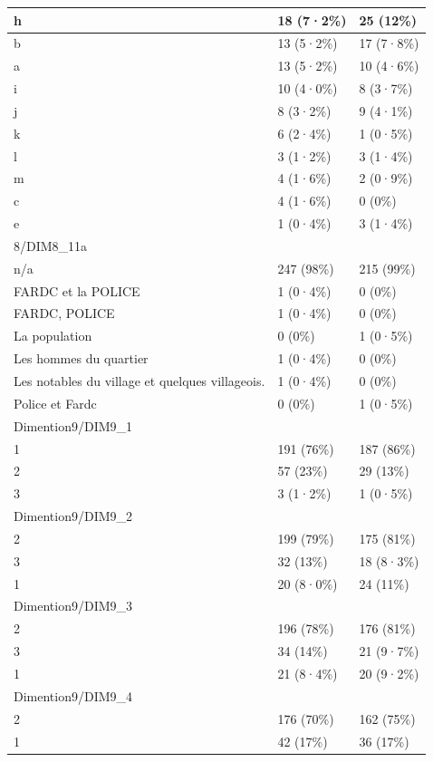 \documentclass[
]{book}
\begin{document}
\begin{tabular}{l|l|l}
\hline
h & 18 (7·2\%) & 25 (12\%)\\
\hline
b & 13 (5·2\%) & 17 (7·8\%)\\
\hline
a & 13 (5·2\%) & 10 (4·6\%)\\
\hline
i & 10 (4·0\%) & 8 (3·7\%)\\
\hline
j & 8 (3·2\%) & 9 (4·1\%)\\
\hline
k & 6 (2·4\%) & 1 (0·5\%)\\
\hline
l & 3 (1·2\%) & 3 (1·4\%)\\
\hline
m & 4 (1·6\%) & 2 (0·9\%)\\
\hline
c & 4 (1·6\%) & 0 (0\%)\\
\hline
e & 1 (0·4\%) & 3 (1·4\%)\\
\hline
8/DIM8\_11a &  & \\
\hline
n/a & 247 (98\%) & 215 (99\%)\\
\hline
FARDC et la POLICE & 1 (0·4\%) & 0 (0\%)\\
\hline
FARDC, POLICE & 1 (0·4\%) & 0 (0\%)\\
\hline
La population & 0 (0\%) & 1 (0·5\%)\\
\hline
Les hommes du quartier & 1 (0·4\%) & 0 (0\%)\\
\hline
Les notables du village et quelques villageois. & 1 (0·4\%) & 0 (0\%)\\
\hline
Police et Fardc & 0 (0\%) & 1 (0·5\%)\\
\hline
Dimention9/DIM9\_1 &  & \\
\hline
1 & 191 (76\%) & 187 (86\%)\\
\hline
2 & 57 (23\%) & 29 (13\%)\\
\hline
3 & 3 (1·2\%) & 1 (0·5\%)\\
\hline
Dimention9/DIM9\_2 &  & \\
\hline
2 & 199 (79\%) & 175 (81\%)\\
\hline
3 & 32 (13\%) & 18 (8·3\%)\\
\hline
1 & 20 (8·0\%) & 24 (11\%)\\
\hline
Dimention9/DIM9\_3 &  & \\
\hline
2 & 196 (78\%) & 176 (81\%)\\
\hline
3 & 34 (14\%) & 21 (9·7\%)\\
\hline
1 & 21 (8·4\%) & 20 (9·2\%)\\
\hline
Dimention9/DIM9\_4 &  & \\
\hline
2 & 176 (70\%) & 162 (75\%)\\
\hline
1 & 42 (17\%) & 36 (17\%)\\
\hline

\end{tabular}
\end{document}
